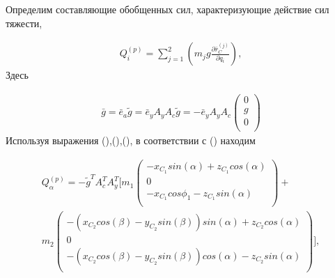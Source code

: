 Определим составляющие обобщенных сил, характеризующие действие сил тяжести, \par


\begin{equation} %
\label{eq:p3:34}
\begin{multlined}
Q_{i}^{ \left( p \right) }= \sum _{j=1}^{2} \left( m_{j}g \frac{ \partial \bar{r}_{C}^{ \left( j \right) }}{ \partial q_{i}} \right) ,
\end{multlined}
\end{equation}
Здесь\par


\begin{equation} %
\label{eq:p3:35}
\begin{multlined}
\bar{g}=\bar{e}_{a}\tilde{g}=\bar{e}_{y}A_{y}A_{c}\tilde{g}=-\bar{e}_{y}A_{y}A_{c} \left( \begin{matrix}
0\\
g\\
0\\
\end{matrix}
\right) 
\end{multlined}
\end{equation}
Используя выражения (),(),(), в соответствии с ()  находим \par


\begin{equation} %
\label{eq:p3:36}
\begin{multlined}
Q_{ \alpha }^{ \left( p \right) }=
-\tilde{g}^{T}A_{c}^{T}A_{y}^{T} 
[  
m_{1} \left( 
\begin{matrix}
	-x_{C_{1}}sin \left(  \alpha  \right) +z_{C_{1}}cos \left(  \alpha  \right) \\
	0\\
	-x_{C_{1}}cos \phi _{1}-z_{C_{1}}sin \left(  \alpha  \right) \\
\end{matrix}
\right) +  \\
m_{2} \left( 
\begin{matrix}
	- \left( x_{C_{2}}cos \left(  \beta  \right) -y_{C_{2}}sin \left(  \beta  \right)  \right) sin \left(  \alpha  \right) +z_{C_{2}}cos \left(  \alpha  \right) \\
	0\\
	- \left( x_{C_{2}}cos \left(  \beta  \right) -y_{C_{2}}sin \left(  \beta  \right)  \right) cos \left(  \alpha  \right) -z_{C_{2}}sin \left(  \alpha  \right) \\
\end{matrix}
\right)  
]  ,
\end{multlined}
\end{equation}

